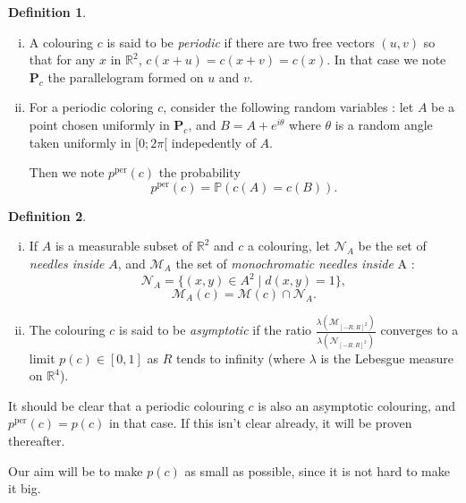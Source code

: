 \documentclass[a4paper,11pt]{article}
\theoremstyle{definition}
\newtheorem{definition}{Definition}
\theoremstyle{remark}
\newcommand{\R}{\mathbb{R}}
\newcommand{\M}{\mathcal{M}}
\newcommand{\N}{\mathcal{N}}
\renewcommand{\Pr}{\mathbb{P}}
\renewcommand{\P}{\mathbf{P}}
\newcommand{\pper}{p^{\mathrm{per}}}
\begin{document}
\begin{definition}
\
\begin{enumerate}[i)] 
\item A colouring $c$ is said to be \textit{periodic} if there are two free
vectors $(u,v)$ so that for any $x$ in $\R ^2$, $c(x+u)=c(x+v)=c(x)$. In that
case we note $\P_c$ the parallelogram formed on $u$ and $v$.
\item For a periodic coloring $c$, consider the following random variables :
let $A$ be a point chosen uniformly in $\P_c$, and $B=A + e^{i \theta}$ where
$\theta$ is a random angle taken uniformly in $[0;2 \pi[$ indepedently of $A$.

Then we note $\pper(c)$ the probability
$$\pper(c) = \Pr(c(A)=c(B)).$$
\end{enumerate}
\end{definition}

\begin{definition}
\
\begin{enumerate}[i)]\label{defas}
\item If $A$ is a measurable subset of $\R^2$ and $c$ a colouring, let $\N_A$ be
the set of \textit{needles inside} $A$, and $\M_A$ the set of \textit{monochromatic
needles inside} A :
\[\N_A = \{(x,y) \in A ^2 \mid d(x,y)=1\}, \]
\[\M_A (c) = \M (c) \cap \N_A. \]

\item  \label{asympt}The colouring $c$ is said to be \textit{asymptotic} if the ratio
$\frac{\lambda (\M_{[-R;R]^2})}{\lambda (\N_{[-R;R]^2})}$ 
converges to a limit $p(c) \in [0,1]$ as $R$ tends to infinity (where $\lambda$ 
is the Lebesgue measure on $\mathbb{R}^4$).
\end{enumerate}
\end{definition}

It should be clear that a periodic colouring $c$ is also an asymptotic colouring,
and $\pper(c)=p(c)$ in that case. If this isn't clear already, it will be proven
thereafter.

Our aim will be to make $p(c)$ as small as possible, since it is not hard
to make it big.
\\
\end{document}
